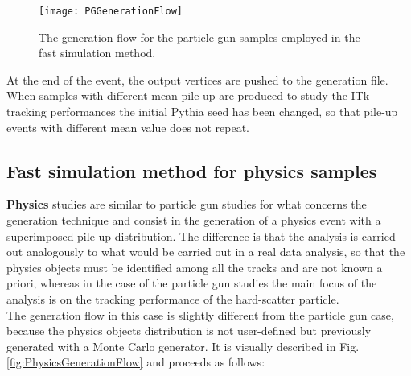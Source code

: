 \documentclass[a4paper,twoside,12pt]{article}
\begin{document}
\begin{figure} [h]
	\texttt{[image: PGGenerationFlow]}
	\caption{The generation flow for the particle gun samples employed in the fast 
	simulation method. }
	\label{fig:PGGenerationFlow}
\end{figure}

At the end of the event, the output vertices are pushed to the generation file.\\

When samples with different mean pile-up are produced to study the ITk tracking
performances the initial Pythia seed has been changed, so that pile-up events with
different mean value does not repeat. \\

\subsection{Fast simulation method for physics samples}\label{subsec:physicsSimulation}

\textbf{Physics} studies are similar to particle gun studies for what concerns the generation technique and 
consist in the generation of a physics event with a superimposed pile-up distribution. The
difference is that the analysis is carried out analogously to what would be carried out
in a real data analysis, so that the physics objects must be identified among all the tracks
and are not known a priori, whereas in the case of the particle gun studies the main focus
of the analysis is on the tracking performance of the hard-scatter particle.\\

The generation flow in this case is slightly different from the particle gun case, because 
the physics objects distribution is not user-defined but previously generated with a Monte
Carlo generator. It is visually described in Fig.\ref{fig:PhysicsGenerationFlow} and proceeds as follows:\\
\end{document}
